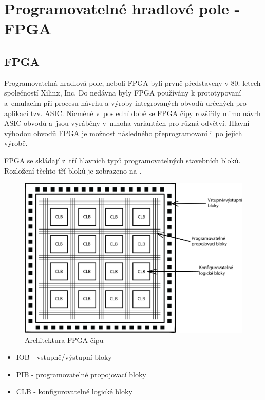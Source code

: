 %
%
%
\chapter{Programovatelné hradlové pole - FPGA}
\section{FPGA}
Programovatelná hradlová pole, neboli FPGA byli prvně představeny v 80. letech společností Xilinx, Inc. Do nedávna byly FPGA používány k prototypovaní a~emulacím při procesu návrhu a výroby integrovaných obvodů určených pro aplikaci tzv. ASIC.\cite{Sekanina3540403779ISBN}
Nicméně v~poslední době se FPGA čipy rozšířily mimo návrh ASIC obvodů a~jsou vyráběny v~mnoha variantách pro různá odvětví. Hlavní výhodou obvodů FPGA je možnost následného přeprogramovaní i~po jejich výrobě.\cite{FPGAfromMIT}

FPGA se skládají z~tří hlavních typů programovatelných stavebních bloků. Rozložení těchto tří bloků je zobrazeno na .
\begin{figure}[!h]
  \begin{center}
    \includegraphics[scale=0.5]{obrazky/FPGA-architekrura-vlastni.png}
  \end{center}
  \caption[Architektura FPGA]{Architektura FPGA čipu \cite{electronicshub.org}}
  \label{img:Architektura}
\end{figure}
\begin{itemize}
    \item IOB - vstupně/výstupní bloky
    \item PIB - programovatelné propojovací bloky
    \item CLB - konfigurovatelné logické bloky
\end{itemize}

